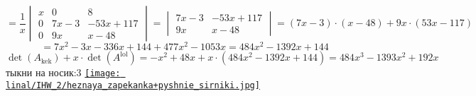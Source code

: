 \documentclass[17pt]{article}
\begin{document}
$$
= \frac{1}{x}
\begin{vmatrix}
    x & 0 & 8\\
    0 & 7x-3 & -53x+117\\
    0 & 9x & x-48
\end{vmatrix}
=
\begin{vmatrix}
    7x-3 & -53x+117\\
    9x & x-48
\end{vmatrix}
= (7x-3)\cdot(x-48)+9x\cdot(53x-117)
$$
$$
=7x^2-3x-336x+144+477x^2-1053x= 484x^2-1392x+144
$$
$$
\det(A_\text{kek}) + x\cdot\det(A^\text{lol}) = -x^2+48x + x\cdot(484x^2-1392x+144) = 484x^3-1393x^2+192x
$$
тыкни на носик:3 \href{http://matrixcalc.org/#determinant\%28\%7B\%7B0,0,x,0,0,8\%7D,\%7B0,0,6,9,0,1\%7D,\%7B1,4,0,7,8,4\%7D,\%7B0,0,0,0,1,7\%7D,\%7Bx,x,0,1,0,x\%7D,\%7B0,x,x,1,5,4\%7D\%7D\%29}{\texttt{[image: linal/IHW\_2/heznaya\_zapekanka+pyshnie\_sirniki.jpg]}}
\end{document}
